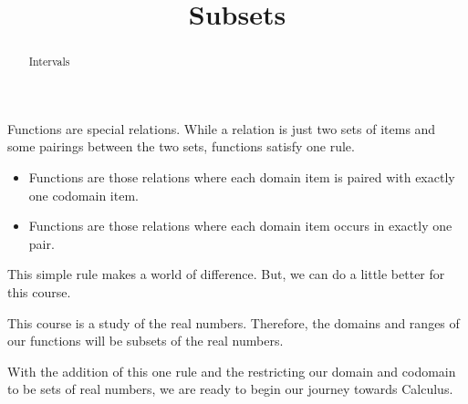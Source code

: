\documentclass{ximera}
\title{Subsets}
\begin{document}
\begin{abstract}
Intervals
\end{abstract}
\maketitle




Functions are special relations. While a relation is just two sets of items and some pairings between the two sets, functions satisfy one rule. 

\begin{itemize}
\item Functions are those relations where each domain item is paired with exactly one codomain item.
\item Functions are those relations where each domain item occurs in exactly one pair.
\end{itemize}


This simple rule makes a world of difference. But, we can do a little better for this course.

This course is a study of the real numbers.  Therefore, the domains and ranges of our functions will be subsets of the real numbers.


With the addition of this one rule and the restricting our domain and codomain to be sets of real numbers, we are ready to begin our journey towards Calculus.
\end{document}
